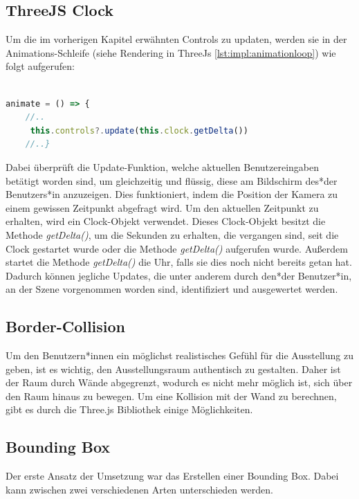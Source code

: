 \subsection{ThreeJS Clock}
\label{Clock}

Um die im vorherigen Kapitel erwähnten Controls zu updaten, werden sie in der Animations-Schleife (siehe Rendering in ThreeJs \ref{lst:impl:animationloop}) wie folgt aufgerufen: 

\begin{lstlisting}[caption={Controls updaten},language=TypeScript]
    
animate = () => {
    //..
     this.controls?.update(this.clock.getDelta())
    //..}

    \end{lstlisting}

Dabei überprüft die Update-Funktion, welche aktuellen Benutzereingaben betätigt worden sind, um gleichzeitig und flüssig, diese am Bildschirm des*der Benutzers*in anzuzeigen. Dies funktioniert, indem die Position der Kamera zu einem gewissen Zeitpunkt abgefragt wird. Um den aktuellen Zeitpunkt zu erhalten, wird ein Clock-Objekt verwendet. Dieses Clock-Objekt besitzt die Methode \emph{getDelta()}, um die Sekunden zu erhalten, die vergangen sind, seit die Clock gestartet wurde oder die Methode \emph{getDelta()} aufgerufen wurde. Außerdem startet die Methode \emph{getDelta()} die Uhr, falls sie dies noch nicht bereits getan hat. Dadurch können jegliche Updates, die unter anderem durch den*der Benutzer*in, an der Szene vorgenommen worden sind, identifiziert und ausgewertet werden.

\cite{ThreeJsClock}

\subsection{Border-Collision}
Um den Benutzern*innen ein möglichst realistisches Gefühl für die Ausstellung zu geben, ist es wichtig, den Ausstellungsraum authentisch zu gestalten. Daher ist der Raum durch Wände abgegrenzt, wodurch es nicht mehr möglich ist, sich über den Raum hinaus zu bewegen. Um eine Kollision mit der Wand zu berechnen, gibt es durch die Three.js Bibliothek einige Möglichkeiten.


\subsection{Bounding Box}
Der erste Ansatz der Umsetzung war das Erstellen einer Bounding Box. Dabei kann zwischen zwei verschiedenen Arten unterschieden werden. 


